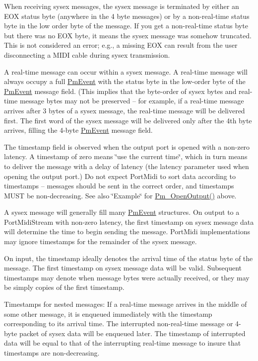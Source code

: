 When receiving sysex messages, the sysex message is terminated by either an E\+OX status byte (anywhere in the 4 byte messages) or by a non-\/real-\/time status byte in the low order byte of the message. If you get a non-\/real-\/time status byte but there was no E\+OX byte, it means the sysex message was somehow truncated. This is not considered an error; e.\+g., a missing E\+OX can result from the user disconnecting a M\+I\+DI cable during sysex transmission.

A real-\/time message can occur within a sysex message. A real-\/time message will always occupy a full \hyperlink{struct_pm_event}{Pm\+Event} with the status byte in the low-\/order byte of the \hyperlink{struct_pm_event}{Pm\+Event} message field. (This implies that the byte-\/order of sysex bytes and real-\/time message bytes may not be preserved -- for example, if a real-\/time message arrives after 3 bytes of a sysex message, the real-\/time message will be delivered first. The first word of the sysex message will be delivered only after the 4th byte arrives, filling the 4-\/byte \hyperlink{struct_pm_event}{Pm\+Event} message field.

The timestamp field is observed when the output port is opened with a non-\/zero latency. A timestamp of zero means \char`\"{}use the current time\char`\"{}, which in turn means to deliver the message with a delay of latency (the latency parameter used when opening the output port.) Do not expect Port\+Midi to sort data according to timestamps -- messages should be sent in the correct order, and timestamps M\+U\+ST be non-\/decreasing. See also \char`\"{}\+Example\char`\"{} for \hyperlink{group__grp__device_ga134924cfa8badeecff3c5e1f22aee178}{Pm\+\_\+\+Open\+Output()} above.

A sysex message will generally fill many \hyperlink{struct_pm_event}{Pm\+Event} structures. On output to a Port\+Midi\+Stream with non-\/zero latency, the first timestamp on sysex message data will determine the time to begin sending the message. Port\+Midi implementations may ignore timestamps for the remainder of the sysex message.

On input, the timestamp ideally denotes the arrival time of the status byte of the message. The first timestamp on sysex message data will be valid. Subsequent timestamps may denote when message bytes were actually received, or they may be simply copies of the first timestamp.

Timestamps for nested messages\+: If a real-\/time message arrives in the middle of some other message, it is enqueued immediately with the timestamp corresponding to its arrival time. The interrupted non-\/real-\/time message or 4-\/byte packet of sysex data will be enqueued later. The timestamp of interrupted data will be equal to that of the interrupting real-\/time message to insure that timestamps are non-\/decreasing. 

